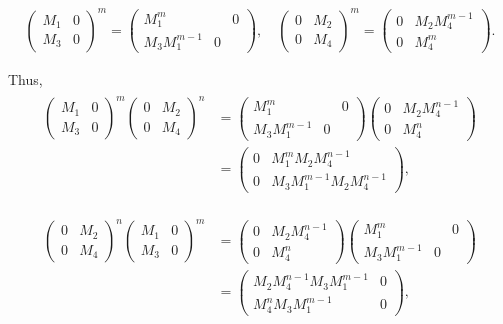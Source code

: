 \begin{align}
  \begin{pmatrix} M_1 & 0 \\ M_3 & 0 \end{pmatrix}^{m} =   \begin{pmatrix} M_1^m && 0 \\ M_3M_1^{m-1} & 0 \end{pmatrix} ,\quad \begin{pmatrix} 0 & M_2 \\ 0 & M_4 \end{pmatrix}^m = \begin{pmatrix} 0 & M_2M_4^{m-1} \\ 0 & M_4^m \end{pmatrix}.
\end{align}

Thus, 
\begin{align}
\begin{split}
  \begin{pmatrix} M_1 & 0 \\ M_3 & 0 \end{pmatrix}^{m}\begin{pmatrix} 0 & M_2 \\ 0 & M_4 \end{pmatrix}^n &=  \begin{pmatrix} M_1^m && 0 \\ M_3M_1^{m-1} & 0 \end{pmatrix}\begin{pmatrix} 0 & M_2M_4^{n-1} \\ 0 & M_4^n \end{pmatrix} \\ 
  &= \begin{pmatrix}0 & M_1^m M_2 M^{n-1}_4 \\ 0 & M_3M_1^{m-1}M_2M_4^{n-1} \end{pmatrix},
\end{split}
\end{align}

\begin{align}
\begin{split}
\begin{pmatrix} 0 & M_2 \\ 0 & M_4 \end{pmatrix}^n\begin{pmatrix} M_1 & 0 \\ M_3 & 0 \end{pmatrix}^{m} &= \begin{pmatrix} 0 & M_2M_4^{n-1} \\ 0 & M_4^n \end{pmatrix}\begin{pmatrix} M_1^m && 0 \\ M_3M_1^{m-1} & 0 \end{pmatrix}\\
&= \begin{pmatrix} M_2M_4^{n-1}M_3M_1^{m-1} & 0 \\ M_4^n M_3 M_1^{m-1} & 0\end{pmatrix},
\end{split}
\end{align}

